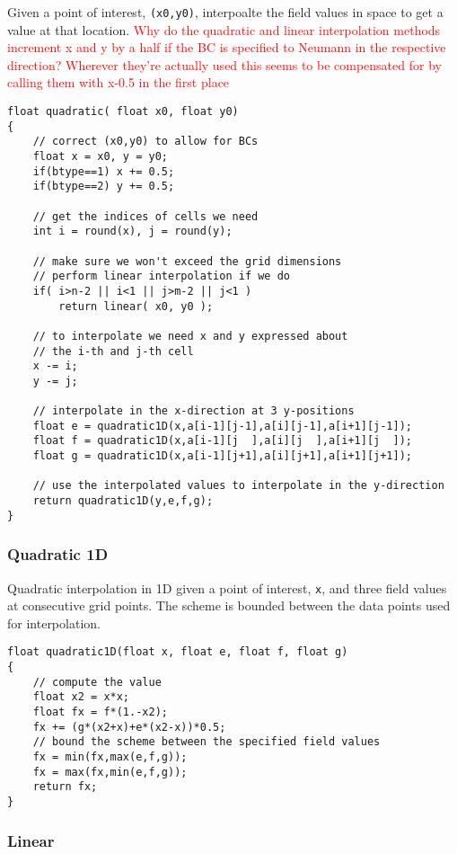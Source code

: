 \documentclass[notitlepage]{article}
\begin{document}
Given a point of interest, \texttt{(x0,y0)}, interpoalte the field values in space to
get a value at that location.
\textcolor{red}{Why do the quadratic and linear interpolation methods increment x and y
by a half if the BC is specified to Neumann in the respective direction? Wherever they're
actually used this seems to be compensated for by calling them with x-0.5 in the first place}

\begin{lstlisting}[style=myCpp]
float quadratic( float x0, float y0)
{
	// correct (x0,y0) to allow for BCs
	float x = x0, y = y0;
	if(btype==1) x += 0.5;
	if(btype==2) y += 0.5;
	
	// get the indices of cells we need
	int i = round(x), j = round(y);
	
	// make sure we won't exceed the grid dimensions
	// perform linear interpolation if we do
	if( i>n-2 || i<1 || j>m-2 || j<1 )
		return linear( x0, y0 );
	
	// to interpolate we need x and y expressed about
	// the i-th and j-th cell
	x -= i;
	y -= j;
	
	// interpolate in the x-direction at 3 y-positions
	float e = quadratic1D(x,a[i-1][j-1],a[i][j-1],a[i+1][j-1]);
	float f = quadratic1D(x,a[i-1][j  ],a[i][j  ],a[i+1][j  ]);
	float g = quadratic1D(x,a[i-1][j+1],a[i][j+1],a[i+1][j+1]);
	
	// use the interpolated values to interpolate in the y-direction
	return quadratic1D(y,e,f,g);
}
\end{lstlisting}

\subsubsection{Quadratic 1D}

Quadratic interpolation in 1D given a point of interest, \texttt{x}, and three field
values at consecutive grid points. The scheme is bounded between the data points
used for interpolation.

\begin{lstlisting}[style=myCpp]
float quadratic1D(float x, float e, float f, float g)
{
	// compute the value
	float x2 = x*x;
	float fx = f*(1.-x2);
	fx += (g*(x2+x)+e*(x2-x))*0.5;
	// bound the scheme between the specified field values
	fx = min(fx,max(e,f,g));
	fx = max(fx,min(e,f,g));
	return fx;
} 
\end{lstlisting}

\subsubsection{Linear}
\end{document}
